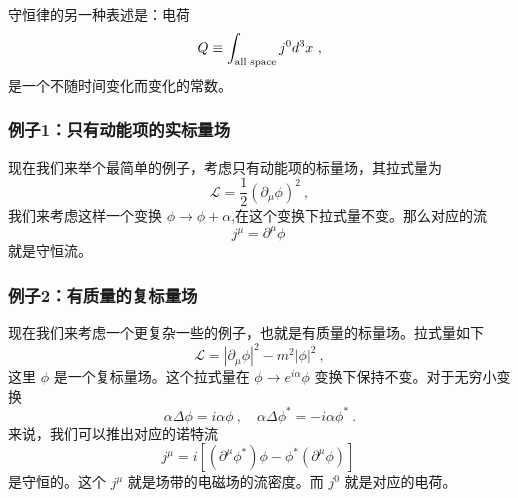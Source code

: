 守恒律的另一种表述是：电荷
\begin{equation}
Q \equiv \int_{\rm all\,\, space} j^0 d^3 x~,
\end{equation}
是一个不随时间变化而变化的常数。

\subsubsection{例子1：只有动能项的实标量场}
现在我们来举个最简单的例子，考虑只有动能项的标量场，其拉式量为
\begin{equation}
\mathcal L = \frac{1}{2} (\partial_\mu \phi)^2~,
\end{equation}
我们来考虑这样一个变换 $\phi \rightarrow \phi + \alpha $,在这个变换下拉式量不变。那么对应的流
\begin{equation}
j^\mu = \partial^\mu \phi~
\end{equation}
就是守恒流。

\subsubsection{例子2：有质量的复标量场}
现在我们来考虑一个更复杂一些的例子，也就是有质量的标量场。拉式量如下
\begin{equation}
\mathcal L = |\partial_\mu\phi|^2 - m^2 |\phi|^2~,
\end{equation}
这里 $\phi$ 是一个复标量场。这个拉式量在 $\phi\rightarrow e^{i\alpha}\phi$ 变换下保持不变。对于无穷小变换
\begin{equation}\label{eq_classi_18}
\alpha \Delta \phi = i \alpha \phi~,\quad \alpha \Delta \phi^* = -i\alpha \phi^*~.
\end{equation}
来说，我们可以推出对应的诺特流
\begin{equation}
j^\mu = i[(\partial^\mu \phi^*)\phi-\phi^*(\partial^\mu \phi)]~
\end{equation}
是守恒的。这个 $j^\mu$ 就是场带的电磁场的流密度。而 $j^0$ 就是对应的电荷。


